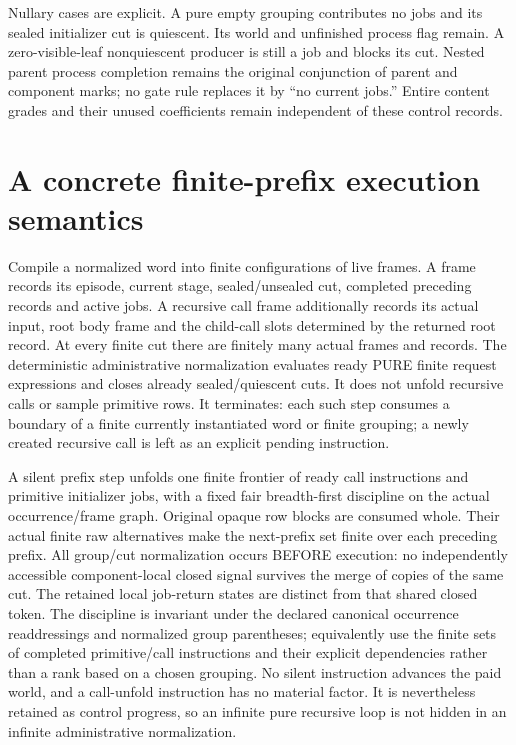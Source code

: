 \documentclass[11pt]{article}
\begin{document}
Nullary cases are explicit. A pure empty grouping contributes no jobs and its sealed initializer cut is quiescent. Its world and unfinished process flag remain. A zero-visible-leaf nonquiescent producer is still a job and blocks its cut. Nested parent process completion remains the original conjunction of parent and component marks; no gate rule replaces it by ``no current jobs.'' Entire content grades and their unused coefficients remain independent of these control records.

\section{A concrete finite-prefix execution semantics}
Compile a normalized word into finite configurations of live frames. A frame records its episode, current stage, sealed/unsealed cut, completed preceding records and active jobs. A recursive call frame additionally records its actual input, root body frame and the child-call slots determined by the returned root record. At every finite cut there are finitely many actual frames and records. The deterministic administrative normalization evaluates ready PURE finite request expressions and closes already sealed/quiescent cuts. It does not unfold recursive calls or sample primitive rows. It terminates: each such step consumes a boundary of a finite currently instantiated word or finite grouping; a newly created recursive call is left as an explicit pending instruction.

A silent prefix step unfolds one finite frontier of ready call instructions and primitive initializer jobs, with a fixed fair breadth-first discipline on the actual occurrence/frame graph. Original opaque row blocks are consumed whole. Their actual finite raw alternatives make the next-prefix set finite over each preceding prefix. All group/cut normalization occurs BEFORE execution: no independently accessible component-local closed signal survives the merge of copies of the same cut. The retained local job-return states are distinct from that shared closed token. The discipline is invariant under the declared canonical occurrence readdressings and normalized group parentheses; equivalently use the finite sets of completed primitive/call instructions and their explicit dependencies rather than a rank based on a chosen grouping. No silent instruction advances the paid world, and a call-unfold instruction has no material factor. It is nevertheless retained as control progress, so an infinite pure recursive loop is not hidden in an infinite administrative normalization.
\end{document}
